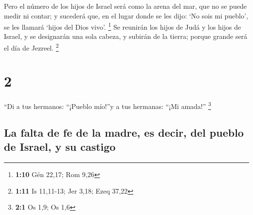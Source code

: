  Pero el número de los hijos de Israel será como la arena
del mar, que no se puede medir ni contar; y sucederá que, en el lugar
donde se les dijo: `No sois mi pueblo', se les llamará `hijos del Dios
vivo'. \footnote{\textbf{1:10} Gén 22,17; Rom 9,26}  Se
reunirán los hijos de Judá y los hijos de Israel, y se designarán una
sola cabeza, y subirán de la tierra; porque grande será el día de
Jezreel. \footnote{\textbf{1:11} Is 11,11-13; Jer 3,18; Ezeq 37,22}

\hypertarget{section-1}{%
\section{2}\label{section-1}}

 ``Di a tus hermanos: ``¡Pueblo mío!''y a tus hermanas:
``¡Mi amada!'' \footnote{\textbf{2:1} Os 1,9; Os 1,6}

\hypertarget{la-falta-de-fe-de-la-madre-es-decir-del-pueblo-de-israel-y-su-castigo}{%
\subsection{La falta de fe de la madre, es decir, del pueblo de Israel,
y su
castigo}\label{la-falta-de-fe-de-la-madre-es-decir-del-pueblo-de-israel-y-su-castigo}}

